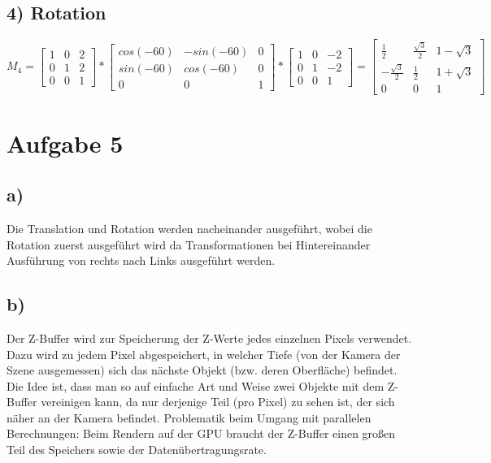 \documentclass[12pt,pdftex,a4paper]{article}
\begin{document}
\subsection*{4) Rotation}
\[
M_4=
\begin{bmatrix}
1 & 0 & 2\\
0 & 1 & 2\\
0 & 0 & 1
\end{bmatrix}
*
\begin{bmatrix}
cos(-60) & -sin(-60) & 0\\
sin(-60) & cos(-60) & 0\\
0 & 0 & 1
\end{bmatrix}
*
\begin{bmatrix}
1 & 0 & -2\\
0 & 1 & -2\\
0 & 0 & 1
\end{bmatrix}
=
\begin{bmatrix}
\frac{1}{2} & \frac{\sqrt{3}}{2} & 1-\sqrt{3}\\
-\frac{\sqrt{3}}{2} & \frac{1}{2} & 1+\sqrt{3}\\
0 & 0 & 1

\end{bmatrix}
\]

\section*{Aufgabe 5}
\subsection*{a)}
Die Translation und Rotation werden nacheinander ausgeführt, wobei die Rotation zuerst ausgeführt wird da Transformationen bei Hintereinander Ausführung von rechts nach Links ausgeführt werden.

\subsection*{b)}
Der Z-Buffer wird zur Speicherung der Z-Werte jedes einzelnen Pixels verwendet. Dazu wird zu jedem Pixel abgespeichert, in welcher Tiefe (von der Kamera der Szene ausgemessen) sich das nächste Objekt (bzw. deren Oberfläche) befindet. Die Idee ist, dass man so auf einfache Art und Weise zwei Objekte mit dem Z-Buffer vereinigen kann, da nur derjenige Teil (pro Pixel) zu sehen ist, der sich näher an der Kamera befindet.
Problematik beim Umgang mit parallelen Berechnungen: Beim Rendern auf der GPU braucht der Z-Buffer einen großen Teil des Speichers sowie der Datenübertragungsrate.
\end{document}
